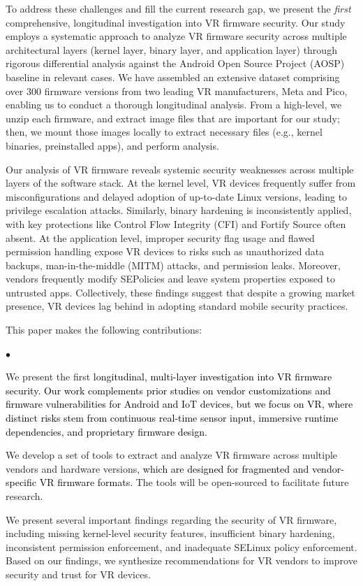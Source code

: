 \documentclass[sigconf]{acmart}
\newcommand{\bheading}[1]{{\vspace{2pt}\noindent{\textbf{#1}}}}
\newcommand{\rev}[1]{\textcolor{black}{#1}}
\newenvironment{packeditemize}{
\begin{list}{$\bullet$}{
\setlength{\labelwidth}{6pt}
\setlength{\itemsep}{2pt}
\setlength{\leftmargin}{\labelwidth}
\addtolength{\leftmargin}{\labelsep}
\setlength{\parindent}{1pt}
\setlength{\listparindent}{\parindent}
\setlength{\parsep}{1pt}
\setlength{\topsep}{1pt}}}{\end{list}}
\begin{document}
To address these challenges and fill the current research gap, we present the {\it first} comprehensive, longitudinal investigation into VR firmware security.
Our study employs a systematic approach to analyze VR firmware security across multiple architectural layers (kernel layer, binary layer, and application layer) through rigorous differential analysis against the Android Open Source Project (AOSP) baseline in relevant cases.
We have assembled an extensive dataset comprising over 300  firmware versions from two leading VR manufacturers, Meta and Pico, enabling us to conduct a thorough longitudinal analysis.
From a high-level, we unzip each firmware, and extract  image files that are important for our study; then,
we mount those images locally to extract necessary files (e.g., kernel binaries, preinstalled apps), and perform analysis.

\bheading{Findings.}
Our analysis of VR firmware reveals systemic security weaknesses across multiple layers of the software stack. 
At the kernel level, VR devices frequently suffer from misconfigurations and delayed adoption of up-to-date Linux versions, leading to privilege escalation attacks.
Similarly, binary hardening is inconsistently applied, with key protections like Control Flow Integrity (CFI) and Fortify Source often absent.
At the application level, improper security flag usage and flawed permission handling expose VR devices to risks such as unauthorized data backups, man-in-the-middle (MITM) attacks, and permission leaks.
Moreover, vendors frequently modify SEPolicies and leave system properties exposed to untrusted apps.
Collectively, these findings suggest that despite a growing market presence, VR devices lag behind in adopting standard mobile security practices.

\bheading{Contributions.} 
This paper makes the following contributions:
\begin{packeditemize}
    \item We present the first \rev{longitudinal, multi-layer investigation into VR firmware security. Our work complements prior studies on vendor customizations and firmware vulnerabilities for Android and IoT devices, but we focus on VR, where distinct risks stem from continuous real-time sensor input, immersive runtime dependencies, and proprietary firmware design.}
\item We develop a set of tools to extract and analyze VR firmware across multiple vendors and hardware versions, \rev{which are designed for fragmented and vendor-specific VR firmware formats.} The tools will be open-sourced to facilitate future research.
    \item We present several important findings regarding the security of VR firmware, including missing kernel-level security features, insufficient binary hardening, inconsistent permission enforcement, and inadequate SELinux policy enforcement. Based on our findings, we synthesize recommendations for VR vendors to improve security and trust for VR devices.
\end{packeditemize}
\end{document}
